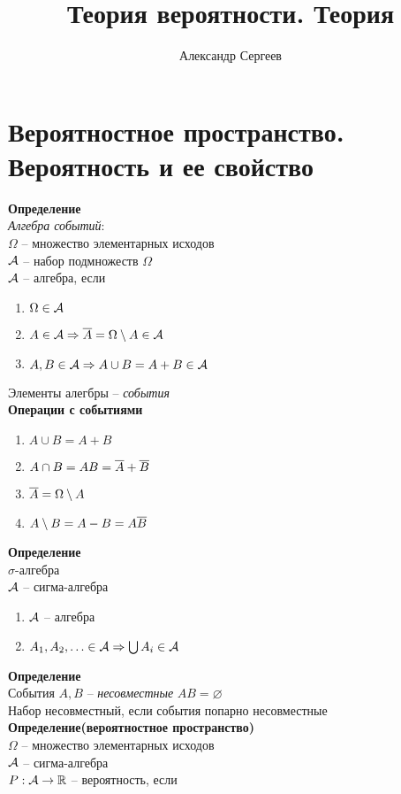 \documentclass[12pt]{article}
\title{Теория вероятности. Теория}
\author{Александр Сергеев}
\date{}
\begin{document}
\maketitle
\section{Вероятностное пространство. Вероятность и ее свойство}
\textbf{Определение}\\
\textit{Алгебра событий}:\\
$\Omega$ -- множество элементарных исходов\\
$\mathcal{A}$ -- набор подмножеств $\Omega$\\
$\mathcal{A}$ -- алгебра, если
\begin{enumerate}
    \item $\Omega \in \mathcal{A}$
    \item $A \in \mathcal{A} \Rightarrow \overline A = \Omega \setminus A \in \mathcal{A}$
    \item $A, B \in \mathcal{A} \Rightarrow A \cup B = A + B \in \mathcal{A}$
\end{enumerate}
Элементы алегбры -- \textit{события}\\
\textbf{Операции с событиями}
\begin{enumerate}
    \item $A \cup B = A + B$
    \item $A \cap B = AB = \overline A + \overline B$
    \item $\overline A = \Omega \setminus A$
    \item $A \setminus B = A - B = A\overline B$
\end{enumerate}
\textbf{Определение}\\
$\sigma$-алгебра\\
$\mathcal{A}$ -- сигма-алгебра
\begin{enumerate}
    \item $\mathcal{A}$ -- алгебра
    \item $A_1, A_2, \ldots \in \mathcal{A} \Rightarrow \bigcup A_i \in \mathcal{A}$
\end{enumerate}
\textbf{Определение}\\
События $A, B$ -- \textit{несовместные} $AB = \varnothing$\\
Набор несовместный, если события попарно несовместные\\
\textbf{Определение(вероятностное пространство)}\\
$\Omega$ -- множество элементарных исходов\\
$\mathcal{A}$ -- сигма-алгебра\\
$P: \mathcal{A} \rightarrow \mathbb{R}$ -- вероятность, если
\end{document}
